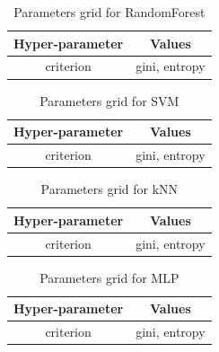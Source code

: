 \begin{table}
  \caption{Parameters grid for RandomForest}
  \label{tab:grid-rf}
  \begin{tabular}{|c|c|}
    \toprule
    Hyper-parameter & Values \\
    \midrule
    criterion & gini, entropy \\
    \bottomrule
  \end{tabular}
\end{table}

\begin{table}
  \caption{Parameters grid for SVM}
  \label{tab:grid-svm}
  \begin{tabular}{|c|c|}
    \toprule
    Hyper-parameter & Values \\
    \midrule
    criterion & gini, entropy \\
    \bottomrule
  \end{tabular}
\end{table}

\begin{table}
  \caption{Parameters grid for kNN}
  \label{tab:grid-knn}
  \begin{tabular}{|c|c|}
    \toprule
    Hyper-parameter & Values \\
    \midrule
    criterion & gini, entropy \\
    \bottomrule
  \end{tabular}
\end{table}

\begin{table}
  \caption{Parameters grid for MLP}
  \label{tab:grid-mlp}
  \begin{tabular}{|c|c|}
    \toprule
    Hyper-parameter & Values \\
    \midrule
    criterion & gini, entropy \\
    \bottomrule
  \end{tabular}
\end{table}
